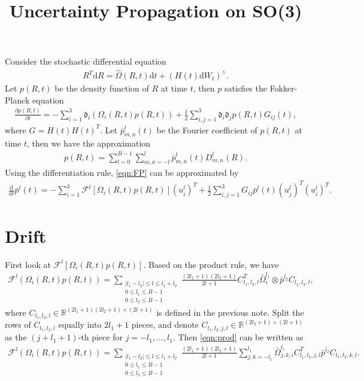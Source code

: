 \documentclass[12pt]{article}
\title{\vspace{-4ex}\textbf{Uncertainty Propagation on SO(3)\vspace{-4ex}}}
\date{}
\newcommand{\abs}[1]{\ensuremath{\left| #1 \right|}}
\newcommand{\diff}[1]{\mathrm{d}#1}
\newcommand{\liediff}{\mathfrak{d}}
\newcommand{\dft}{\mathcal{F}}
\newcommand{\real}{\ensuremath{\mathbb{R}}}
\begin{document}
\maketitle

Consider the stochastic differential equation
\begin{align*}
	R^T\diff{R} = \hat{\Omega}(R,t)\diff{t} + (H(t)\diff{W_t})^\wedge.
\end{align*}
Let $p(R,t)$ be the density function of $R$ at time $t$, then $p$ satisfies the Fokker-Planck equation
\begin{align}
	\frac{\partial p(R,t)}{\partial t} = -\sum_{i=1}^3 \liediff_i(\Omega_i(R,t)p(R,t)) + \frac{1}{2} \sum_{i,j=1}^3 \liediff_i\liediff_jp(R,t) G_{ij}(t), \label{eqn:FP}
\end{align}
where $G = H(t)H(t)^T$.
Let $\bar{p}_{m,n}^l(t)$ be the Fourier coefficient of $p(R,t)$ at time $t$, then we have the approximation
\begin{align*}
	p(R,t) = \sum_{l=0}^{B-1} \sum_{m,n=-l}^l \bar{p}_{m,n}^l(t) D_{m,n}^l(R).
\end{align*}
Using the differentiation rule, \eqref{eqn:FP} can be approximated by
\begin{align*}
	\frac{\diff{}}{\diff{t}} \bar{p}^l(t) = -\sum_{i=1}^3 \dft^l[\Omega_i(R,t)p(R,t)] (u_i^l)^T + \frac{1}{2}\sum_{i,j=1}^3 G_{ij} \bar{p}^l(t) (u_j^l)^T(u_i^l)^T.
\end{align*}

\section{Drift}

First look at $\mathcal{F}^l[\Omega_i(R,t)p(R,t)]$.
Based on the product rule, we have
\begin{align}
	\mathcal{F}^l(\Omega_i(R,t)p(R,t)) = \sum_{\substack{\abs{l_1-l_2} \leq l \leq l_1+l_2 \\ 0 \leq l_1 \leq B-1 \\ 0 \leq l_2 \leq B-1}} \frac{(2l_1+1)(2l_2+1)}{2l+1} C_{l_1,l_2,l}^T \bar{\Omega}_i^{l_1} \otimes \bar{p}^{l_2} C_{l_1,l_2,l}, \label{eqn:prod}
\end{align}
where $C_{l_1,l_2,l}\in\real^{(2l_1+1)(2l_2+1) \times (2l+1)}$ is defined in the previous note.
Split the rows of $C_{l_1,l_2,l}$ equally into $2l_1+1$ pieces, and denote $C_{l_1,l_2,j,l} \in \real^{(2l_2+1) \times (2l+1)}$ as the $(j+l_1+1)$-th piece for $j=-l_1,\ldots,l_1$.
Then \eqref{eqn:prod} can be written as
\begin{align} \label{eqn:l,l2}
	\mathcal{F}^l(\Omega_i(R,t)p(R,t)) = \sum_{\substack{\abs{l_1-l_2} \leq l \leq l_1+l_2 \\ 0 \leq l_1 \leq B-1 \\ 0 \leq l_2 \leq B-1}} \frac{(2l_1+1)(2l_2+1)}{2l+1} \sum_{j,k=-l_1}^{l_1} \bar{\Omega}_{j,k,i}^{l_1} C_{l_1,l_2,j,l}^T \bar{p}^{l_2} C_{l_1,l_2,k,l}.
\end{align}
\end{document}

